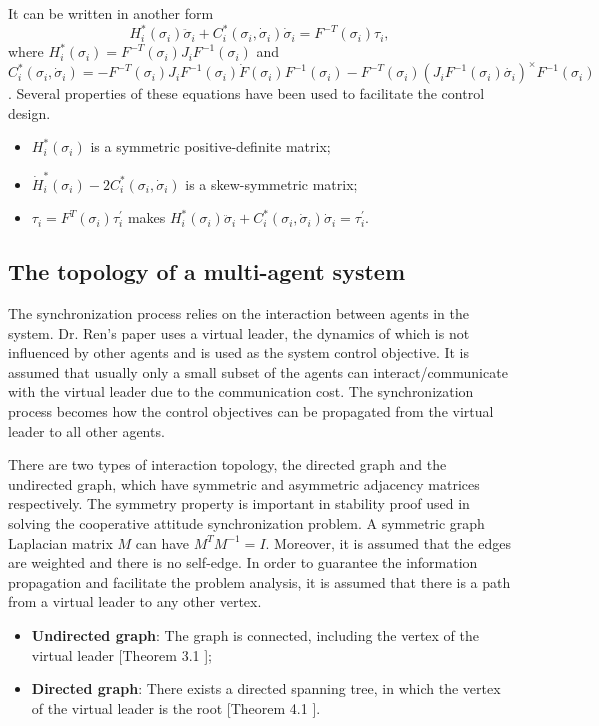 It can be written in another form 
\begin{equation}
H^{*}_{i} ( \sigma_{i} ) \ddot{\sigma}_{i} + C^{*}_{i} ( \sigma_{i} , \dot{ \sigma }_{i} ) \dot{ \sigma }_{i} = F^{-T} ( \sigma_{i} ) \tau_{i} ,
\end{equation}
where $ H^{*}_{i} ( \sigma_{i} ) = F^{-T} ( \sigma_{i} ) J_{i} F^{-1} ( \sigma_{i} ) $ and
$ C^{*}_{i} ( \sigma_{i} , \dot{ \sigma }_{i} ) = - F^{-T} ( \sigma_{i} ) J_{i} F^{-1} ( \sigma_{i} ) \dot{F} ( \sigma_{i} ) F^{-1} ( \sigma_{i} ) - F^{-T} ( \sigma_{i} ) ( J_{i} F^{-1} ( \sigma_{i} ) \dot{ \sigma_{i} } )^{ \times } F^{-1} ( \sigma_{i} ) $.
Several properties of these equations have been used to facilitate the control design.
\begin{itemize}
\item $ H^{*}_{i} ( \sigma_{i} ) $ is a symmetric positive-definite matrix;
\item $ \dot{H}^{*}_{i} ( \sigma_{i} ) - 2 C^{*}_{i} ( \sigma_{i} , \dot{ \sigma }_{i} ) $ is a skew-symmetric matrix;
\item $ \tau_{i} = F^{T}( \sigma_{i} ) \tau^{'}_{i} $ makes $ H^{*}_{i} ( \sigma_{i} ) \ddot{\sigma}_{i} + C^{*}_{i} ( \sigma_{i} , \dot{ \sigma }_{i} ) \dot{ \sigma }_{i} = \tau^{'}_{i} $.
\end{itemize}

\subsection{The topology of a multi-agent system}
\label{sec:sys_topo}

The synchronization process relies on the interaction between agents in the system.
Dr. Ren's paper \cite{5229134} uses a virtual leader, the dynamics of which is not influenced by other agents and is used as the system control objective.
It is assumed that usually only a small subset of the agents can interact/communicate with the virtual leader due to the communication cost.
The synchronization process becomes how the control objectives can be propagated from the virtual leader to all other agents.  

There are two types of interaction topology, the directed graph and the undirected graph, which have symmetric and asymmetric adjacency matrices respectively.
The symmetry property is important in stability proof used in solving the cooperative attitude synchronization problem.
A symmetric graph Laplacian matrix $ M $ can have $ M^{T} M^{-1} = I $.
Moreover, it is assumed that the edges are weighted and there is no self-edge.
In order to guarantee the information propagation and facilitate the problem analysis, it is assumed that there is a path from a virtual leader to any other vertex.
\begin{itemize}
\item \textbf{Undirected graph}: The graph is connected, including the vertex of the virtual leader [Theorem 3.1 \cite{5229134}];
\item \textbf{Directed graph}:  There exists a directed spanning tree, in which the vertex of the virtual leader is the root [Theorem 4.1 \cite{5229134}].
\end{itemize}

